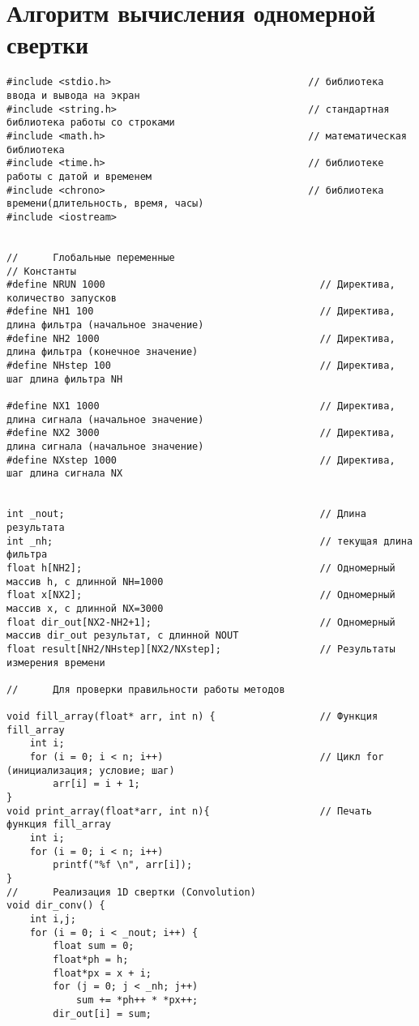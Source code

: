 \chapter{Алгоритм вычисления одномерной свертки}\label{app:Ж}
\begin{lstlisting}
#include <stdio.h>                                  // библиотека ввода и вывода на экран
#include <string.h>                                 // стандартная библиотека работы со строками
#include <math.h>                                   // математическая библиотека
#include <time.h>                                   // библиотеке работы с датой и временем
#include <chrono>                                   // библиотека времени(длительность, время, часы)
#include <iostream>


//      Глобальные переменные
// Константы
#define NRUN 1000                                     // Директива, количество запусков
#define NH1 100                                       // Директива, длина фильтра (начальное значение)
#define NH2 1000                                      // Директива, длина фильтра (конечное значение)
#define NHstep 100                                    // Директива,  шаг длина фильтра NH

#define NX1 1000                                      // Директива, длина сигнала (начальное значение)
#define NX2 3000                                      // Директива, длина сигнала (начальное значение)
#define NXstep 1000                                   // Директива,  шаг длина сигнала NX


int _nout;                                            // Длина результата
int _nh;                                              // текущая длина фильтра
float h[NH2];                                         // Одномерный массив h, с длинной NH=1000
float x[NX2];                                         // Одномерный массив x, с длинной NX=3000
float dir_out[NX2-NH2+1];                             // Одномерный массив dir_out результат, с длинной NOUT
float result[NH2/NHstep][NX2/NXstep];                 // Результаты измерения времени

//      Для проверки правильности работы методов

void fill_array(float* arr, int n) {                  // Функция fill_array
    int i;
    for (i = 0; i < n; i++)                           // Цикл for (инициализация; условие; шаг)
        arr[i] = i + 1;
}
void print_array(float*arr, int n){                   // Печать функция fill_array
    int i;
    for (i = 0; i < n; i++)
        printf("%f \n", arr[i]);
}
//      Реализация 1D свертки (Convolution)
void dir_conv() {
    int i,j;
    for (i = 0; i < _nout; i++) {
        float sum = 0;
        float*ph = h;
        float*px = x + i;
        for (j = 0; j < _nh; j++)
            sum += *ph++ * *px++;
        dir_out[i] = sum;


\end{lstlisting}
